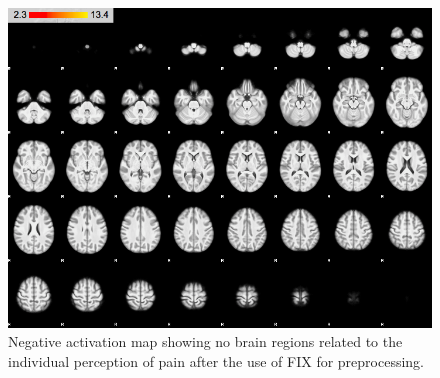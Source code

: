 \begin{figure}[H]                 
	\includegraphics[width=.65\textwidth]{figures/Results/FIX_neg_ID}  
	\caption{Negative activation map showing no brain regions related to the individual perception of pain after the use of FIX for preprocessing.}
	\label{FIX_neg_ID} 
\end{figure}


















